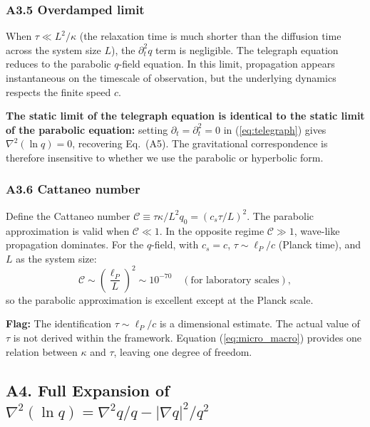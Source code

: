 \documentclass[reprint]{revtex4-2}
\begin{document}
\subsubsection{A3.5 Overdamped limit}

When $\tau \ll L^2/\kappa$ (the relaxation time is much shorter than the diffusion time across the system size $L$), the $\partial_t^2 q$ term is negligible. The telegraph equation reduces to the parabolic $q$-field equation. In this limit, propagation appears instantaneous on the timescale of observation, but the underlying dynamics respects the finite speed $c$.

\textbf{The static limit of the telegraph equation is identical to the static limit of the parabolic equation:} setting $\partial_t = \partial_t^2 = 0$ in (\ref{eq:telegraph}) gives $\nabla^2(\ln q)=0$, recovering Eq.~(A5). The gravitational correspondence is therefore insensitive to whether we use the parabolic or hyperbolic form.

\subsubsection{A3.6 Cattaneo number}

Define the Cattaneo number $\mathcal{C} \equiv \tau\kappa/L^2q_0 = (c_s\tau/L)^2$. The parabolic approximation is valid when $\mathcal{C} \ll 1$. In the opposite regime $\mathcal{C} \gg 1$, wave-like propagation dominates. For the $q$-field, with $c_s=c$, $\tau \sim \ell_P/c$ (Planck time), and $L$ as the system size:
\begin{equation}
\mathcal{C} \sim \left(\frac{\ell_P}{L}\right)^2 \sim 10^{-70} \quad (\text{for laboratory scales}),
\end{equation}
so the parabolic approximation is excellent except at the Planck scale.

\textbf{Flag:} The identification $\tau \sim \ell_P/c$ is a dimensional estimate. The actual value of $\tau$ is not derived within the framework. Equation (\ref{eq:micro_macro}) provides one relation between $\kappa$ and $\tau$, leaving one degree of freedom.

\subsection{A4. Full Expansion of $\nabla^2(\ln q) = \nabla^2 q/q - |\nabla q|^2/q^2$}
\end{document}
